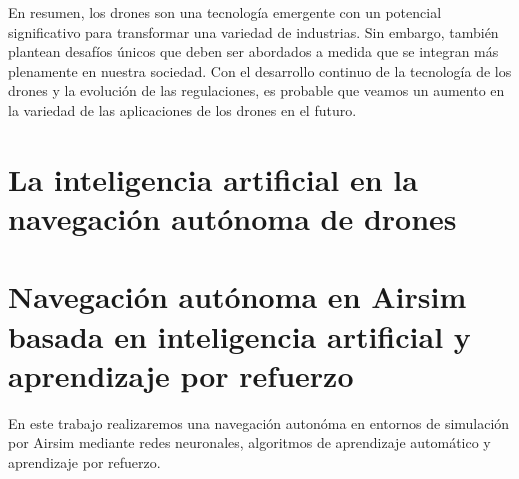 En resumen, los drones son una tecnología emergente con un potencial significativo para transformar una variedad de industrias. Sin embargo, también plantean desafíos
únicos que deben ser abordados a medida que se integran más plenamente en nuestra sociedad. Con el desarrollo continuo de la tecnología de los drones y la evolución de las
regulaciones, es probable que veamos un aumento en la variedad de las aplicaciones de los drones en el futuro.



\newpage
\section{La inteligencia artificial en la navegación autónoma de drones}
\label{sec:IA}



\newpage
\section{Navegación autónoma en Airsim basada en inteligencia artificial y aprendizaje por refuerzo}
\label{sec:Navegación autónoma}

En este trabajo realizaremos una navegación autonóma en entornos de simulación por Airsim mediante redes neuronales, algoritmos de aprendizaje automático y aprendizaje 
por refuerzo.

